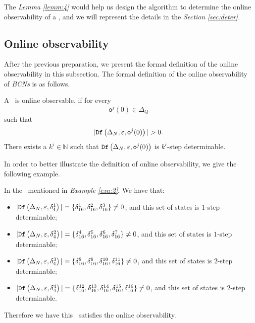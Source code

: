 The {\em Lemma \ref{lemm:4}} would help us design the algorithm to determine the online observability of a \BCN, and we will represent the details in the {\em Section \ref{sec:deter}}.


\subsection{Online observability}
After the previous preparation, we present the formal definition of the online observability in this subsection. The formal definition of the online observability of {\em BCNs} is as follows.

\begin{definition}
 A \BCN\ is online observable,
if for every \[\mathsf{o}^{j}(0)\in \Delta_Q\] such that \[|\Ded\left(\Delta_N,\varepsilon, \mathsf{o}^{j}(0)\right)|> 0.\] There exists a $k^{i}\in \mathbb{N}$ such that ${\tt Df}\left(\Delta_N,\varepsilon,\mathsf{o}^{j}(0)\right)$ is $k^{i}$-step determinable.
\end{definition}


 In order to better illustrate the definition of online observability, we give the following example.

\begin{example}
In the \BCN\ mentioned in {\em Example \ref{exa:2}}.  We have that:
 \begin{itemize}
 \item $|{\tt Df}\left(\Delta_N,\varepsilon, \delta_{4}^1\right)|=\{\delta_{16}^1,\delta_{16}^2,\delta_{16}^3\}\neq 0$, and this set of states is $1$-step determinable;
 \item $|{\tt Df}\left(\Delta_N,\varepsilon, \delta_{4}^2\right)|=\{\delta_{16}^4,\delta_{16}^5,\delta_{16}^6,\delta_{16}^7\}\neq 0$, and this set of states is $1$-step determinable;
 \item $|{\tt Df}\left(\Delta_N,\varepsilon, \delta_{4}^3\right)|=\{\delta_{16}^8,\delta_{16}^9,\delta_{16}^{10},\delta_{16}^{11}\}\neq 0$, and this set of states is $2$-step determinable;
 \item $|{\tt Df}\left(\Delta_N,\varepsilon, \delta_{4}^4\right)|=\{\delta_{16}^{12},\delta_{16}^{13},\delta_{16}^{14},\delta_{16}^{15},\delta_{16}^{16}\}\neq 0$, and this set of states is $2$-step determinable.
 \end{itemize}
 
Therefore we have this \BCN\ satisfies the online observability.
\label{exa:10}
\end{example}  

